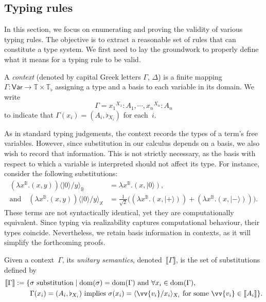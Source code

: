 \documentclass[runningheads,orivec,envcountsame,envcountsect]{llncs}
\newcommand\ket[1]{\ensuremath{|#1\rangle}}
\newcommand\Var{\ensuremath{\mathsf{Var}}}
\newcommand\ansubst[2]{\ensuremath{\langle #1 \rangle_{#2}}}
\newcommand\dom[1]{\mathrm{dom}(#1)}
\def\Pair#1#2{(#1,#2)} %
\def\Lam#1#2#3{\lambda#1^{#2}{.}#3} %
\def\Type{\mathbb{T}}
\def\BasisType{\Type_\flat}
\def\sem#1{\llbracket#1\rrbracket}
\newcommand\B{\mathbb B}
\newcommand\XB{\mathbb X}
\newcommand\basis[1]{\ensuremath{\flat_{#1}}}
\begin{document}
\subsection{Typing rules}    
In this section, we focus on enumerating and proving the validity of various
typing rules. The objective is to extract a reasonable set of rules that can
constitute a type system. We first need to lay the groundwork to properly define
what it means for a typing rule to be valid.

\begin{definition}
  A \emph{context} (denoted by capital Greek letters $\Gamma$, $\Delta$) is a
  finite mapping $\Gamma:\Var\to\Type\times\BasisType$ assigning a type and a
  basis to each variable in its domain. We write
  \[
    \Gamma = {x_1}^{{X_1}}:A_1,\dotsb, {x_n}^{{X_n}}:A_n
  \]
  to indicate that $\Gamma(x_i)=(A_i,\basis{X_i})$ for each~$i$.
\end{definition}

As in standard typing judgements, the context records the types of a term's
free variables. However, since substitution in our calculus depends on a basis,
we also wish to record that information. This is not strictly necessary, as the
basis with respect to which a variable is interpreted should not affect its
type. For instance, consider the following substitutions:
\begin{align*}
(\Lam{x}{\B}{\Pair{x}{y}})\ansubst{\ket{0}/y}{\B}
  &= \Lam{x}{\B}{\Pair{x}{\ket{0}}},\\
\text{and}\quad
(\Lam{x}{\B}{(x, y)})\ansubst{\ket{0}/y}{\XB}
  &= \tfrac{1}{\sqrt{2}}
    \bigl((\Lam{x}{\B}{\Pair{x}{\ket{+}}})
         + (\Lam{x}{\B}{\Pair{x}{\ket{-}}})\bigr).
\end{align*}
These terms are not syntactically identical, yet they are computationally
equivalent. 
Since typing via realizability captures computational behaviour,
their types coincide. Nevertheless, we retain basis information in contexts, as
it will simplify the forthcoming proofs.

\begin{definition}
  Given a context~$\Gamma$, its \emph{unitary semantics},
  denoted~$\sem{\Gamma}$, is the set of substitutions defined by
  \begin{align*}
    \sem{\Gamma}
    := 
    \{&\sigma~\text{substitution} \mid 
      \dom{\sigma} = \dom{\Gamma}
      \text{ and } \forall {x_i} \in \dom{\Gamma},\\
      &\Gamma(x_i) = (A_i, \basis{X_i})
      \text{ implies }
      \sigma(x_i) = \ansubst{\vv{v_i}/x_i}{{X_i}}
      \text{ for some }\vv{v_i} \in \sem{A_i}\}.
  \end{align*}
\end{definition}
\end{document}
